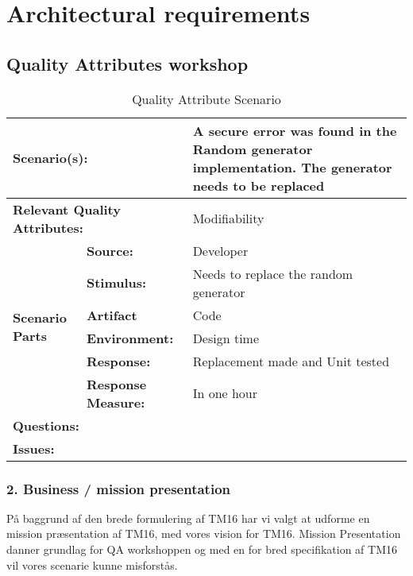 \section{Architectural requirements}    
\subsection{Quality Attributes workshop}

\begin{table}[!htp]
\begin{center}
\begin{tabular}{|p{0.3cm}|p{2.5cm}|p{8cm}|}
  \hline
  \multicolumn{2}{|p{3cm}|}{\bfseries Scenario(s):} & A secure error was found in the Random generator implementation. The generator needs to be replaced \\
  \hline
  \multicolumn{2}{|p{3cm}|}{\bfseries Relevant Quality Attributes:} & Modifiability\\
  \hline
  \multirow{6}{*}{\begin{sideways}{\bfseries Scenario Parts}\end{sideways}}
  & {\bfseries Source:} & Developer \\
  \cline{2-3}
  & {\bfseries Stimulus:} & Needs to replace the random generator \\
  \cline{2-3}
  & {\bfseries Artifact} &  Code \\
  \cline{2-3}
  & {\bfseries Environment:} &  Design time \\
  \cline{2-3}
  & {\bfseries Response:} &  Replacement made and Unit tested\\
  \cline{2-3}
  & {\bfseries Response Measure:} & In one hour\\
  \hline
  \multicolumn{2}{|p{3cm}|}{\bfseries Questions:} &  \\
  \hline
  \multicolumn{2}{|p{3cm}|}{\bfseries Issues:} &  \\
  \hline
\end{tabular}
\caption{Quality Attribute Scenario}
\end{center}
\end{table}

\subsubsection{2. Business / mission presentation}

På baggrund af den brede formulering af TM16 har vi valgt at udforme en mission præsentation af TM16, med vores vision for TM16. Mission Presentation danner grundlag for QA workshoppen og med en for bred specifikation af TM16 vil vores scenarie kunne misforstås. 


